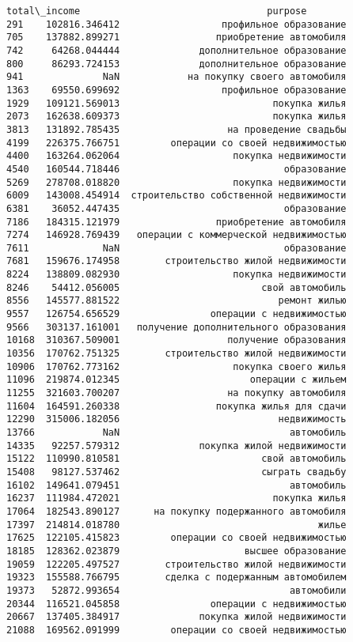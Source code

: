 \documentclass[11pt]{article}
\begin{document}
\begin{Verbatim}[commandchars=\\\{\}]
        total\_income                                 purpose
291    102816.346412                  профильное образование
705    137882.899271                 приобретение автомобиля
742     64268.044444              дополнительное образование
800     86293.724153              дополнительное образование
941              NaN            на покупку своего автомобиля
1363    69550.699692                  профильное образование
1929   109121.569013                           покупка жилья
2073   162638.609373                           покупка жилья
3813   131892.785435                   на проведение свадьбы
4199   226375.766751         операции со своей недвижимостью
4400   163264.062064                    покупка недвижимости
4540   160544.718446                             образование
5269   278708.018820                    покупка недвижимости
6009   143008.454914  строительство собственной недвижимости
6381    36052.447435                             образование
7186   184315.121979                 приобретение автомобиля
7274   146928.769439   операции с коммерческой недвижимостью
7611             NaN                             образование
7681   159676.174958        строительство жилой недвижимости
8224   138809.082930                    покупка недвижимости
8246    54412.056005                         свой автомобиль
8556   145577.881522                            ремонт жилью
9557   126754.656529                операции с недвижимостью
9566   303137.161001   получение дополнительного образования
10168  310367.509001                   получение образования
10356  170762.751325        строительство жилой недвижимости
10906  170762.773162                    покупка своего жилья
11096  219874.012345                       операции с жильем
11255  321603.700207                   на покупку автомобиля
11604  164591.260338                 покупка жилья для сдачи
12290  315006.182056                            недвижимость
13766            NaN                              автомобиль
14335   92257.579312              покупка жилой недвижимости
15122  110990.810581                         свой автомобиль
15408   98127.537462                         сыграть свадьбу
16102  149641.079451                              автомобиль
16237  111984.472021                           покупка жилья
17064  182543.890127      на покупку подержанного автомобиля
17397  214814.018780                                   жилье
17625  122105.415823         операции со своей недвижимостью
18185  128362.023879                      высшее образование
19059  122205.497527        строительство жилой недвижимости
19323  155588.766795        сделка с подержанным автомобилем
19373   52872.993654                              автомобили
20344  116521.045858                операции с недвижимостью
20667  137405.384917              покупка жилой недвижимости
21088  169562.091999         операции со своей недвижимостью
\end{Verbatim}
\end{document}
